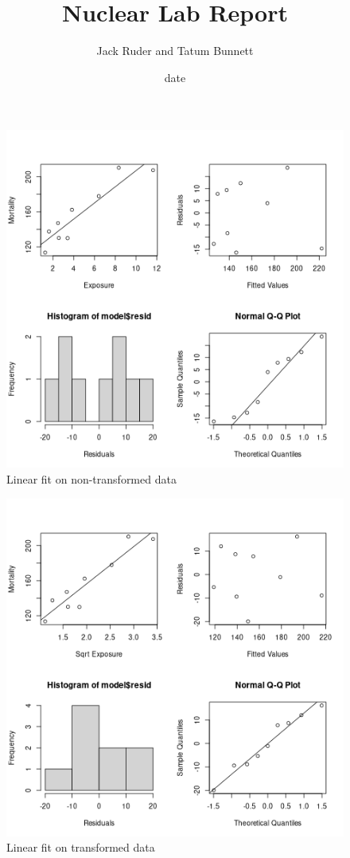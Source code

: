 \documentclass[a4paper]{article}
\title{Nuclear Lab Report}
\date{date}
\author{Jack Ruder and Tatum Bunnett}
\begin{document}
\doublespacing
\maketitle

\begin{figure}[htpb]
	\centering
	\includegraphics[width=\textwidth]{"../originalData.png"}
	\caption{Linear fit on non-transformed data}
	\label{fig:ogdat}
\end{figure}

\begin{figure}[htpb]
	\centering
	\includegraphics[width=\textwidth]{"../sqrtExposreXmortality.png"}
	\caption{Linear fit on transformed data}
	\label{fig:sqdat}
\end{figure}
\end{document}
